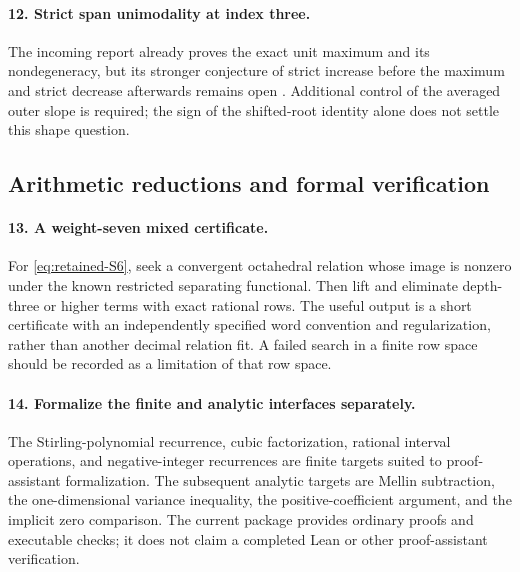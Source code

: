 \documentclass[11pt,a4paper]{article}
\theoremstyle{definition}
\theoremstyle{remark}
\numberwithin{equation}{section}
\begin{document}
\paragraph{12. Strict span unimodality at index three.}
The incoming report already proves the exact unit maximum and its
nondegeneracy, but its stronger conjecture of strict increase before
the maximum and strict decrease afterwards remains open
\cite{IncomingPhase}. Additional control of the averaged outer slope
is required; the sign of the shifted-root identity alone does not
settle this shape question.

\subsection{Arithmetic reductions and formal verification}

\paragraph{13. A weight-seven mixed certificate.}
For \eqref{eq:retained-S6}, seek a convergent octahedral relation whose
image is nonzero under the known restricted separating functional.
Then lift and eliminate depth-three or higher terms with exact rational
rows. The useful output is a short certificate with an independently
specified word convention and regularization, rather than another
decimal relation fit. A failed search in a finite row space should be
recorded as a limitation of that row space.

\paragraph{14. Formalize the finite and analytic interfaces separately.}
The Stirling-polynomial recurrence, cubic factorization, rational
interval operations, and negative-integer recurrences are finite
targets suited to proof-assistant formalization. The subsequent
analytic targets are Mellin subtraction, the one-dimensional variance
inequality, the positive-coefficient argument, and the implicit
zero comparison. The current package provides ordinary proofs and
executable checks; it does not claim a completed Lean or other
proof-assistant verification.

\end{document}
